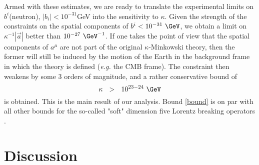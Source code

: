\documentclass[prl,tightenlines]{revtex4}
\begin{document}
Armed with these estimates, we are ready to translate the experimental limits on $b^i$(neutron),
$|b_i|< 10^{-31}$GeV into the sensitivity to $\kappa$.
Given the strength of the constraints on the spatial components of $ b^i < 10^{-31}~\GeV $, we
obtain a limit on $ \kappa^{-1}|\vec{a}| $ better than $ 10^{-27}~\GeV^{-1} $. If one takes the point of view
that the spatial components of $ a^\mu $ are not part of the original $ \kappa $-Minkowski theory, then the 
former will still be induced by the motion of the Earth in the background frame in which the theory is defined
({\it e.g.} the CMB frame). 
The constraint then weakens by some 3 orders of magnitude, and a rather conservative bound of 
\begin{equation}
\label{bound}
	\kappa ~~>~~ 10^{23-24}~\GeV
\end{equation}
is obtained. This is the main result of our analysis. 
Bound \eqref{bound} is on par with all other bounds for the so-called "soft" dimension five
Lorentz breaking operators \cite{Bolokhov:2007yc}.  



\section{Discussion}
\end{document}
